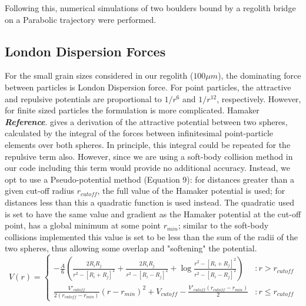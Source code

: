 \documentclass[letterpaper, preprint, paper,11pt]{AAS}	%
\begin{document}
Following this, numerical simulations of two boulders bound by a regolith bridge on a Parabolic trajectory were performed. 


\subsection{London Dispersion Forces}

For the small grain sizes considered in our regolith ($100\mu m$), the dominating force between particles is London Dispersion force. For point particles, the attractive and repulsive potentials are proportional to $1/r^6$ and $1/r^{12}$, respectively. However, for finite sized particles the formulation is more complicated. Hamaker \textbf{\emph{Reference}}. gives a derivation of the attractive potential between two spheres, calculated by the integral of the forces between infinitesimal point-particle elements over both spheres. In principle, this integral could be repeated for the repulsive term also. However, since we are using a soft-body collision method in our code including this term would provide no additional accuracy. Instead, we opt to use a Pseudo-potential method (Equation 9): for distances greater than a given cut-off radius $r_{cutoff}$, the full value of the Hamaker potential is used; for distances less than this a quadratic function is used instead. The quadratic used is set to have the same value and gradient as the Hamaker potential at the cut-off point, has a global minimum at some point $r_{min}$; similar to the soft-body collisions implemented this value is set to be less than the sum of the radii of the two spheres, thus allowing some overlap and "softening" the potential. 
\begin{equation}
V(r) = \left\{
\begin{array}{lr}
-\frac{A}{6}\left(\frac{2R_iR_j}{r^2-[R_i+R_j]^2}+\frac{2R_iR_j}{r^2-[R_i-R_j]^2}+\log\frac{r^2-[R_i+R_j]^2}{r^2-[R_i-R_j]^2}\right) & : r > r_{cutoff}\\
\frac{V'_{cutoff}}{2(r_{cutoff}-r_{min})}(r-r_{min})^2+V_{cutoff} - \frac{V'_{cutoff}(r_{cutoff}-r_{min})}{2} & : r \leq r_{cutoff}
\end{array}
\right.
\end{equation}
\end{document}
